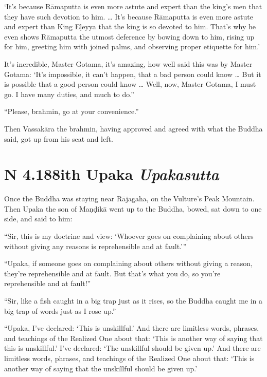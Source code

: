 \documentclass[12pt,openany]{book}%
\newcommand*{\suttatitleacronym}[1]{\smaller[2]{#1}\vspace*{.3em}}
\newcommand*{\suttatitletranslation}[1]{\linebreak{#1}}
\newcommand*{\suttatitleroot}[1]{\linebreak\smaller[2]\itshape{#1}}
\newcommand*{\tocacronym}[1]{\hspace*{-3.3em}{#1}\quad}
\newcommand*{\toctranslation}[1]{#1}
\newcommand*{\tocroot}[1]{(\textit{#1})}
\begin{document}
‘It’s because \textsanskrit{Rāmaputta} is even more astute and expert than the king’s men that they have such devotion to him. … It’s because \textsanskrit{Rāmaputta} is even more astute and expert than King \textsanskrit{Eḷeyya} that the king is so devoted to him. That’s why he even shows \textsanskrit{Rāmaputta} the utmost deference by bowing down to him, rising up for him, greeting him with joined palms, and observing proper etiquette for him.’ 

It’s incredible, Master Gotama, it’s amazing, how well said this was by Master Gotama: ‘It’s impossible, it can’t happen, that a bad person could know … But it is possible that a good person could know … Well, now, Master Gotama, I must go. I have many duties, and much to do.” 

“Please, brahmin, go at your convenience.” 

Then \textsanskrit{Vassakāra} the brahmin, having approved and agreed with what the Buddha said, got up from his seat and left. 

%
\section*{{\suttatitleacronym AN 4.188}{\suttatitletranslation With Upaka }{\suttatitleroot Upakasutta}}
\addcontentsline{toc}{section}{\tocacronym{AN 4.188} \toctranslation{With Upaka } \tocroot{Upakasutta}}

Once the Buddha was staying near \textsanskrit{Rājagaha}, on the Vulture’s Peak Mountain. Then Upaka the son of \textsanskrit{Maṇḍikā} went up to the Buddha, bowed, sat down to one side, and said to him: 

“Sir, this is my doctrine and view: ‘Whoever goes on complaining about others without giving any reasons is reprehensible and at fault.’” 

“Upaka, if someone goes on complaining about others without giving a reason, they’re reprehensible and at fault. But that’s what you do, so you’re reprehensible and at fault!” 

“Sir, like a fish caught in a big trap just as it rises, so the Buddha caught me in a big trap of words just as I rose up.” 

“Upaka, I’ve declared: ‘This is unskillful.’ And there are limitless words, phrases, and teachings of the Realized One about that: ‘This is another way of saying that this is unskillful.’ I’ve declared: ‘The unskillful should be given up.’ And there are limitless words, phrases, and teachings of the Realized One about that: ‘This is another way of saying that the unskillful should be given up.’ 
\end{document}
